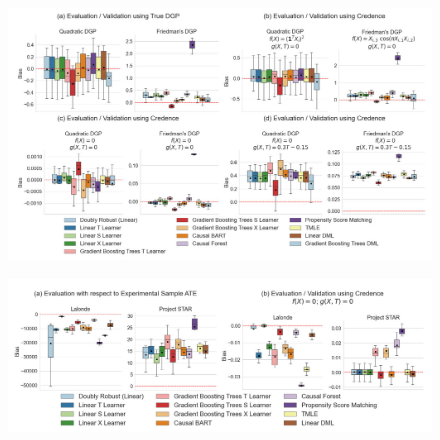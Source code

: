 \documentclass{beamer}
\begin{document}
\begin{frame}
	\begin{figure}
		\includegraphics[width=\textwidth]{fig_3.jpg}
	\end{figure}
\end{frame}
\begin{frame}
	\begin{figure}
		\includegraphics[width=\textwidth]{fig_4.jpg}
	\end{figure}
\end{frame}
\end{document}
